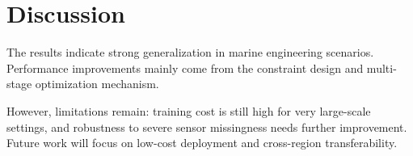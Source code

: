 \section{Discussion}

The results indicate strong generalization in marine engineering scenarios. Performance improvements mainly come from the constraint design and multi-stage optimization mechanism.

However, limitations remain: training cost is still high for very large-scale settings, and robustness to severe sensor missingness needs further improvement. Future work will focus on low-cost deployment and cross-region transferability.
